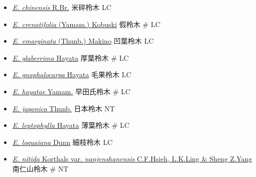\begin{itemize}
  \begin{itemize}
        \item[] \href{http://www.theplantlist.org/tpl1.1/search?q=Eurya+chinensis}{\textit{E. chinensis} R.Br.}   米碎柃木   LC
        \item[] \href{http://www.theplantlist.org/tpl1.1/search?q=Eurya+crenatifolia}{\textit{E. crenatifolia} (Yamam.) Kobuski}   假柃木  \# LC
        \item[] \href{http://www.theplantlist.org/tpl1.1/search?q=Eurya+emarginata}{\textit{E. emarginata} (Thunb.) Makino}   凹葉柃木   LC
        \item[] \href{http://www.theplantlist.org/tpl1.1/search?q=Eurya+glaberrima}{\textit{E. glaberrima} Hayata}   厚葉柃木  \# LC
        \item[] \href{http://www.theplantlist.org/tpl1.1/search?q=Eurya+gnaphalocarpa}{\textit{E. gnaphalocarpa} Hayata}   毛果柃木   LC
        \item[] \href{http://www.theplantlist.org/tpl1.1/search?q=Eurya+hayatae}{\textit{E. hayatae} Yamam.}   早田氏柃木  \# LC
        \item[] \href{http://www.theplantlist.org/tpl1.1/search?q=Eurya+japonica}{\textit{E. japonica} Thunb.}   日本柃木   NT
        \item[] \href{http://www.theplantlist.org/tpl1.1/search?q=Eurya+leptophylla}{\textit{E. leptophylla} Hayata}   薄葉柃木  \# LC
        \item[] \href{http://www.theplantlist.org/tpl1.1/search?q=Eurya+loquaiana}{\textit{E. loquaiana} Dunn}   細枝柃木   LC
        \item[] \href{http://www.theplantlist.org/tpl1.1/search?q=Eurya+nitida+var.+nanjenshanensis}{\textit{E. nitida} Korthals var. \textit{nanjenshanensis} C.F.Hsieh, L.K.Ling \& Sheng Z.Yang}   南仁山柃木  \# NT

\end{itemize}
\end{itemize}
